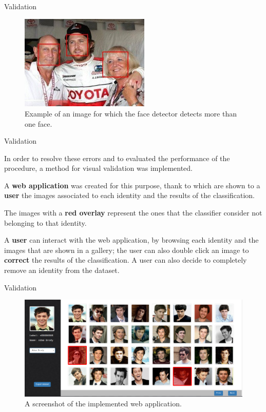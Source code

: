 \begin{tframe}{Validation}

\begin{figure}[h]
\begin{center}
\includegraphics[width=0.55\textwidth]{images/image2a.jpg}
\end{center}
  \caption{Example of an image for which the face detector detects more than one face.}
\label{fig:validation}
\end{figure}

\end{tframe}


\begin{tframe}{Validation}

In order to resolve these errors and to evaluated the performance of the procedure, a method for visual validation was implemented.

\vspace{0.1in}

A \textbf{web application} was created for this purpose, thank to which are shown to a \textbf{user} the images associated to each identity and the results of the classification.

\vspace{0.1in}

The images with a \textbf{red overlay} represent the ones that the classifier consider not belonging to that identity.

\vspace{0.1in}

A \textbf{user} can interact with the web application, by browsing each identity and the images that are shown in a gallery; the user can also double click an image to \textbf{correct} the results of the classification. A user can also decide to completely remove an identity from the dataset.

\end{tframe}


\begin{tframe}{Validation}

\begin{figure}[h]
\begin{center}
\includegraphics[width=1\textwidth]{images/image5.png}
\end{center}
  \caption{A screenshot of the implemented web application.}
\label{fig:validation}
\end{figure}

\end{tframe}